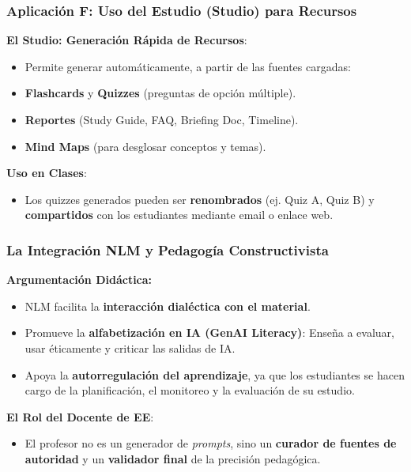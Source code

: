 \documentclass[aspectratio=43]{beamer}
\begin{document}
\begin{frame}
\frametitle{ Aplicación F: Uso del Estudio (Studio) para Recursos}

\textbf{El Studio: Generación Rápida de Recursos}:
\begin{itemize}
    \item Permite generar automáticamente, a partir de las fuentes cargadas:
    \item \textbf{Flashcards} y \textbf{Quizzes} (preguntas de opción múltiple).
    \item \textbf{Reportes} (Study Guide, FAQ, Briefing Doc, Timeline).
    \item \textbf{Mind Maps} (para desglosar conceptos y temas).
\end{itemize}

\vfill
\textbf{Uso en Clases}:
\begin{itemize}
    \item Los quizzes generados pueden ser \textbf{renombrados} (ej. Quiz A, Quiz B) y \textbf{compartidos} con los estudiantes mediante email o enlace web.
\end{itemize}
\end{frame}


\begin{frame}
\frametitle{ La Integración NLM y Pedagogía Constructivista}

\textbf{Argumentación Didáctica:}
\begin{itemize}
    \item NLM facilita la \textbf{interacción dialéctica con el material}.
    \item Promueve la \textbf{alfabetización en IA (GenAI Literacy)}: Enseña a evaluar, usar éticamente y criticar las salidas de IA.
    \item Apoya la \textbf{autorregulación del aprendizaje}, ya que los estudiantes se hacen cargo de la planificación, el monitoreo y la evaluación de su estudio.
\end{itemize}
\vfill
\textbf{El Rol del Docente de EE}:
\begin{itemize}
    \item El profesor no es un generador de \textit{prompts}, sino un \textbf{curador de fuentes de autoridad} y un \textbf{validador final} de la precisión pedagógica.
\end{itemize}
\end{frame}

\end{document}
